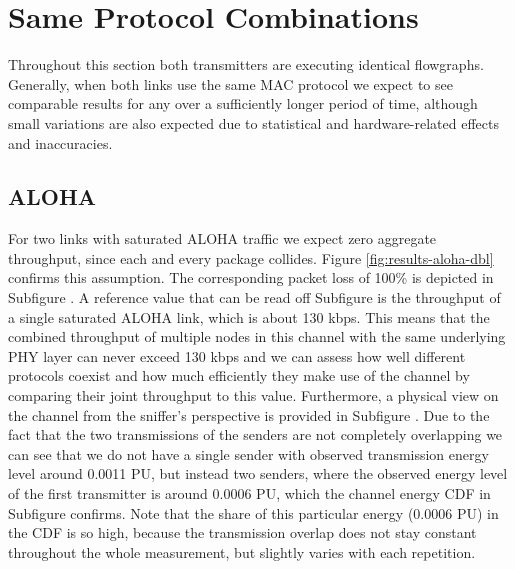 \section{Same Protocol Combinations}

Throughout this section both transmitters are executing identical flowgraphs. Generally, when both links use the same MAC protocol we expect to see comparable results for any over a sufficiently longer period of time, although small variations are also expected due to statistical and hardware-related effects and inaccuracies. 

\subsection{ALOHA}
\label{sec:dbl-aloha}

For two links with saturated ALOHA traffic we expect zero aggregate throughput, since each and every package collides. Figure \ref{fig:results-aloha-dbl}  confirms this assumption. The corresponding packet loss of 100\% is depicted in Subfigure . A reference value that can be read off Subfigure  is the throughput of a single saturated ALOHA link, which is about 130 kbps. This means that the combined throughput of multiple nodes in this channel with the same underlying PHY layer can never exceed 130 kbps and we can assess how well different protocols coexist and how much efficiently they make use of the channel by comparing their joint throughput to this value. Furthermore, a physical view on the channel from the sniffer's perspective is provided in Subfigure . Due to the fact that the two transmissions of the senders are not completely overlapping we can see that we do not have a single sender with observed transmission energy level around 0.0011 PU, but instead two senders, where the observed energy level of the first transmitter is around 0.0006 PU, which the channel energy CDF in Subfigure  confirms. Note that the share of this particular energy (0.0006 PU) in the CDF is so high, because the transmission overlap does not stay constant throughout the whole measurement, but slightly varies with each repetition.

